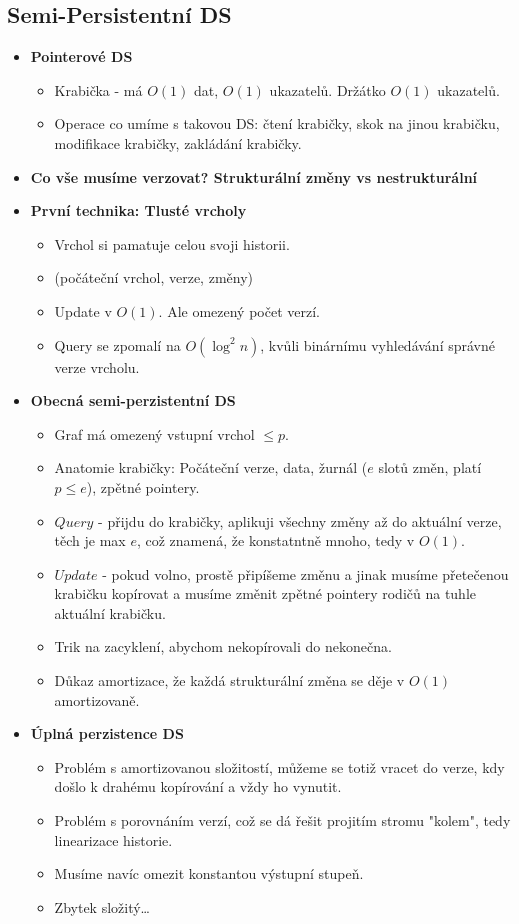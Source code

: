 \documentclass[11pt,a4paper]{article}
\begin{document}
\subsection{Semi-Persistentní DS}
\begin{itemize}
    \item \textbf{Pointerové DS}
    \begin{itemize}
        \item Krabička - má $O(1)$ dat, $O(1)$ ukazatelů. Držátko $O(1)$ ukazatelů.
        \item Operace co umíme s takovou DS: čtení krabičky, skok na jinou krabičku, modifikace krabičky, zakládání krabičky.
    \end{itemize}
    \item \textbf{Co vše musíme verzovat? Strukturální změny vs nestrukturální}
    \item \textbf{První technika: Tlusté vrcholy}
    \begin{itemize}
        \item Vrchol si pamatuje celou svoji historii.
        \item (počáteční vrchol, verze, změny)
        \item Update v $O(1)$. Ale omezený počet verzí.
        \item Query se zpomalí na $O(\log^2 n)$, kvůli binárnímu vyhledávání správné verze vrcholu.
    \end{itemize}
    \item \textbf{Obecná semi-perzistentní DS}
    \begin{itemize}
        \item Graf má omezený vstupní vrchol $\leq p$.
        \item Anatomie krabičky: Počáteční verze, data, žurnál ($e$ slotů změn, platí $p\leq e$), zpětné pointery.
        \item $Query$ - přijdu do krabičky, aplikuji všechny změny až do aktuální verze, těch je max $e$, což znamená, že konstatntně mnoho, tedy v $O(1)$.
        \item $Update$ - pokud volno, prostě připíšeme změnu a jinak musíme přetečenou krabičku kopírovat a musíme změnit zpětné pointery rodičů na tuhle aktuální krabičku.
        \item Trik na zacyklení, abychom nekopírovali do nekonečna.
        \item Důkaz amortizace, že každá strukturální změna se děje v $O(1)$ amortizovaně.
    \end{itemize}
    \item \textbf{Úplná perzistence DS}
    \begin{itemize}
        \item Problém s amortizovanou složitostí, můžeme se totiž vracet do verze, kdy došlo k drahému kopírování a vždy ho vynutit.
        \item Problém s porovnáním verzí, což se dá řešit projitím stromu "kolem", tedy linearizace historie.
        \item Musíme navíc omezit konstantou výstupní stupeň.
        \item Zbytek složitý\dots
    \end{itemize}
\end{itemize}
\end{document}
